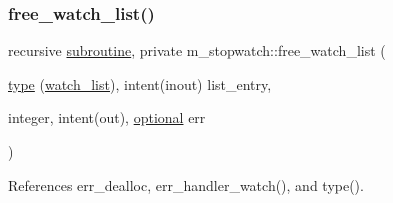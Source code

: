 \subsubsection{\texorpdfstring{free\+\_\+watch\+\_\+list()}{free\_watch\_list()}}
{\footnotesize\ttfamily recursive \hyperlink{M__stopwatch_83_8txt_acfbcff50169d691ff02d4a123ed70482}{subroutine}, private m\+\_\+stopwatch\+::free\+\_\+watch\+\_\+list (\begin{DoxyParamCaption}\item[{\hyperlink{stop__watch_83_8txt_a70f0ead91c32e25323c03265aa302c1c}{type} (\hyperlink{structm__stopwatch_1_1watch__list}{watch\+\_\+list}), intent(inout)}]{list\+\_\+entry,  }\item[{integer, intent(out), \hyperlink{option__stopwatch_83_8txt_aa4ece75e7acf58a4843f70fe18c3ade5}{optional}}]{err }\end{DoxyParamCaption})\hspace{0.3cm}{\ttfamily [private]}}



References err\+\_\+dealloc, err\+\_\+handler\+\_\+watch(), and type().

\mbox{\label{namespacem__stopwatch_a16430afb6979f137951c6d572903e5c5}} 
